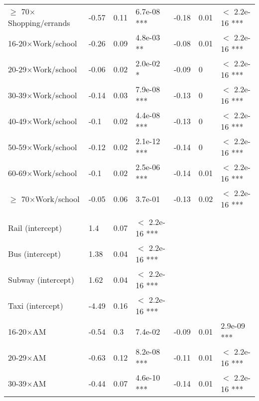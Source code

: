 \documentclass{article}\usepackage[utf8]{inputenc}
\begin{document}
\begin{longtable}[t]{lllllll}
\hspace{1em}$\geq$ 70$\times$Shopping/errands & -0.57 & 0.11 & 6.7e-08 *** & -0.18 & 0.01 & $<$ 2.2e-16 ***\\
\hspace{1em}16-20$\times$Work/school & -0.26 & 0.09 & 4.8e-03 ** & -0.08 & 0.01 & $<$ 2.2e-16 ***\\
\hspace{1em}20-29$\times$Work/school & -0.06 & 0.02 & 2.0e-02 * & -0.09 & 0 & $<$ 2.2e-16 ***\\
\hspace{1em}30-39$\times$Work/school & -0.14 & 0.03 & 7.9e-08 *** & -0.13 & 0 & $<$ 2.2e-16 ***\\
\hspace{1em}40-49$\times$Work/school & -0.1 & 0.02 & 4.4e-08 *** & -0.13 & 0 & $<$ 2.2e-16 ***\\
\hspace{1em}50-59$\times$Work/school & -0.12 & 0.02 & 2.1e-12 *** & -0.14 & 0 & $<$ 2.2e-16 ***\\
\hspace{1em}60-69$\times$Work/school & -0.1 & 0.02 & 2.5e-06 *** & -0.14 & 0.01 & $<$ 2.2e-16 ***\\
\hspace{1em}$\geq$ 70$\times$Work/school & -0.05 & 0.06 & 3.7e-01 & -0.13 & 0.02 & $<$ 2.2e-16 ***\\
\addlinespace[0.3em]
\multicolumn{7}{l}{\textbf{Age$\times$Time of day, McFadden $R^2 = 0.55$}}\\
\hline
\hspace{1em}Rail (intercept) & 1.4 & 0.07 & $<$ 2.2e-16 *** &  &  & \\
\hspace{1em}Bus (intercept) & 1.38 & 0.04 & $<$ 2.2e-16 *** &  &  & \\
\hspace{1em}Subway (intercept) & 1.62 & 0.04 & $<$ 2.2e-16 *** &  &  & \\
\hspace{1em}Taxi (intercept) & -4.49 & 0.16 & $<$ 2.2e-16 *** &  &  & \\
\hspace{1em}16-20$\times$AM & -0.54 & 0.3 & 7.4e-02 & -0.09 & 0.01 & 2.9e-09 ***\\
\hspace{1em}20-29$\times$AM & -0.63 & 0.12 & 8.2e-08 *** & -0.11 & 0.01 & $<$ 2.2e-16 ***\\
\hspace{1em}30-39$\times$AM & -0.44 & 0.07 & 4.6e-10 *** & -0.14 & 0.01 & $<$ 2.2e-16 ***\\

\end{longtable}
\end{document}
